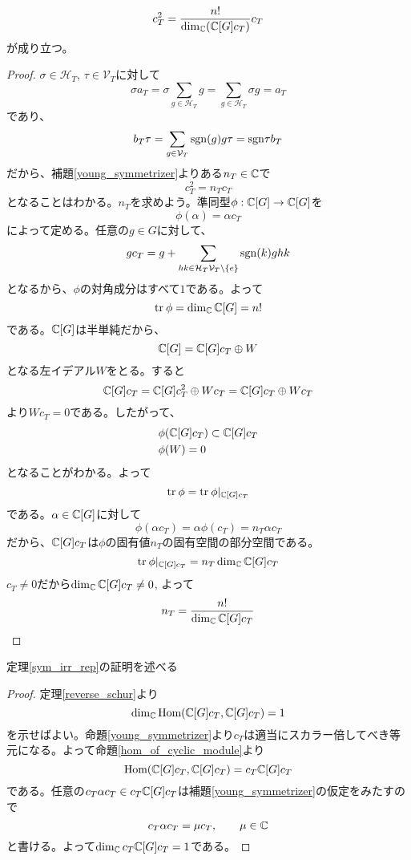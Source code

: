 \documentclass{ltjsreport}
\begin{document}
\begin{prop}\label{square_of_young_sym}
  \[
  c_T^2=\frac{n!}{\dim_{\mathbb{C}}(\mathbb{C}[G]c_T)}c_T  
  \]
  が成り立つ。
\end{prop}

\begin{proof}
  $\sigma\in\mathcal{H}_T$, $\tau\in\mathcal{V}_T$に対して
  \[
  \sigma a_T=\sigma\sum_{g\in\mathcal{H}_T}g=\sum_{g\in\mathcal{H}_T}\sigma g=a_T  
  \]
  であり、
  \[
  b_T\tau=\sum_{g\in\mathcal{V}_T}\mathrm{sgn}(g)g\tau=\mathrm{sgn}{\tau}b_T  
  \]
  だから、補題\ref{young_symmetrizer}よりある$n_T\in\mathbb{C}$で
  \[
  c_T^2=n_T c_T  
  \]
  となることはわかる。$n_T$を求めよう。準同型$\phi:\mathbb{C}[G]\rightarrow\mathbb{C}[G]$を
  \[
  \phi(\alpha)=\alpha c_T  
  \]
  によって定める。任意の$g\in G$に対して、
  \[
  gc_T=g+\sum_{hk\in\mathcal{H}_T\mathcal{V}_T\setminus\{e\}}\mathrm{sgn}(k)ghk  
  \]
  となるから、$\phi$の対角成分はすべて$1$である。よって
  \[
  \text{tr}\:\phi=\dim_{\mathbb{C}}\mathbb{C}[G]=n!  
  \]
  である。$\mathbb{C}[G]$は半単純だから、
  \[
  \mathbb{C}[G]=\mathbb{C}[G]c_T\oplus W  
  \]
  となる左イデアル$W$をとる。すると
  \[
  \mathbb{C}[G]c_T=\mathbb{C}[G]c_T^2\oplus Wc_T=\mathbb{C}[G]c_T\oplus Wc_T 
  \]
  より$Wc_T=0$である。したがって、
  \begin{align*}
    &\phi(\mathbb{C}[G]c_T)\subset \mathbb{C}[G]c_T\\
    &\phi(W)=0
  \end{align*}
  となることがわかる。よって
  \[
  \text{tr}\:\phi=\text{tr}\:\phi|_{\mathbb{C}[G]c_T}  
  \]
  である。$\alpha\in\mathbb{C}[G]$に対して
  \[
  \phi(\alpha c_T)=\alpha\phi(c_T)=n_T\alpha c_T
  \]
  だから、$\mathbb{C}[G]c_T$は$\phi$の固有値$n_T$の固有空間の部分空間である。
  \[
  \text{tr}\:\phi|_{\mathbb{C}[G]c_T}=n_T\dim_{\mathbb{C}}\mathbb{C}[G]c_T 
  \]
  $c_T\neq 0$だから$\dim_{\mathbb{C}}\mathbb{C}[G]c_T\neq 0$,
  よって
  \[
  n_T=\frac{n!}{\dim_{\mathbb{C}}\mathbb{C}[G]c_T}  
  \]
\end{proof}

定理\ref{sym_irr_rep}の証明を述べる

\begin{proof}
  定理\ref{reverse_schur}より
  \[
  \dim_{\mathbb{C}}\text{Hom}(\mathbb{C}[G]c_T,\mathbb{C}[G]c_T)=1  
  \]
  を示せばよい。命題\ref{young_symmetrizer}より$c_T$は適当にスカラー倍してべき等元になる。よって命題\ref{hom_of_cyclic_module}より
  \[
  \text{Hom}(\mathbb{C}[G]c_T,\mathbb{C}[G]c_T)=c_T\mathbb{C}[G]c_T  
  \]
  である。任意の$c_T\alpha c_T\in c_T\mathbb{C}[G]c_T$は補題\ref{young_symmetrizer}の仮定をみたすので
  \[
    c_T\alpha c_T=\mu c_T,\qquad\mu\in\mathbb{C}
  \]
  と書ける。よって$\dim_{\mathbb{C}} c_T\mathbb{C}[G]c_T=1$である。
\end{proof}
\end{document}
